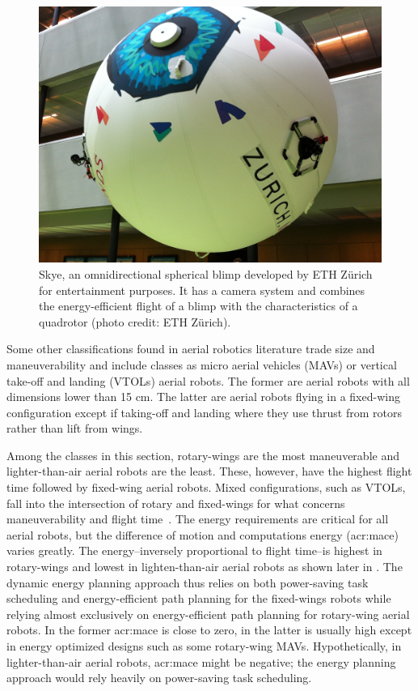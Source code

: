 \begin{figure}[t]
  \centering
  \includegraphics[width=.7\textwidth]{pictures/IMG_2612}
  \caption[Skye, an omnidirectional spherical blimp]{Skye, an omnidirectional spherical blimp developed by ETH Z\"urich for entertainment purposes. It has a camera system and combines the energy-efficient flight of a blimp with the characteristics of a quadrotor {\scriptsize(photo credit: ETH Z\"urich)}.}   
  \label{fig:skye-blimp}
\end{figure}

Some other classifications found in aerial robotics literature trade size and maneuverability and include classes as micro aerial vehicles (MAVs) or vertical take-off and landing (VTOLs) aerial robots. The former are aerial robots with all dimensions lower than 15 cm. The latter are aerial robots flying in a fixed-wing configuration except if taking-off and landing where they use thrust from rotors rather than lift from wings. 

Among the classes in this section, rotary-wings are the most maneuverable and lighter-than-air aerial robots are the least. These, however, have the highest flight time followed by fixed-wing aerial robots. Mixed configurations, such as VTOLs, fall into the intersection of rotary and fixed-wings for what concerns maneuverability and flight time~\citep{siciliano2016springer}. The energy requirements are critical for all aerial robots, but the difference of motion and computations energy (\Gls{acr:mace}) varies greatly. The energy--inversely proportional to flight time--is highest in rotary-wings and lowest in lighten-than-air aerial robots as shown later in . The dynamic energy planning approach thus relies on both power-saving task scheduling and energy-efficient path planning for the fixed-wings robots while relying almost exclusively on energy-efficient path planning for rotary-wing aerial robots. In the former \Gls{acr:mace} is close to zero, in the latter is usually high except in energy optimized designs such as some rotary-wing MAVs. Hypothetically, in lighter-than-air aerial robots, \Gls{acr:mace} might be negative; the energy planning approach would rely heavily on power-saving task scheduling.


